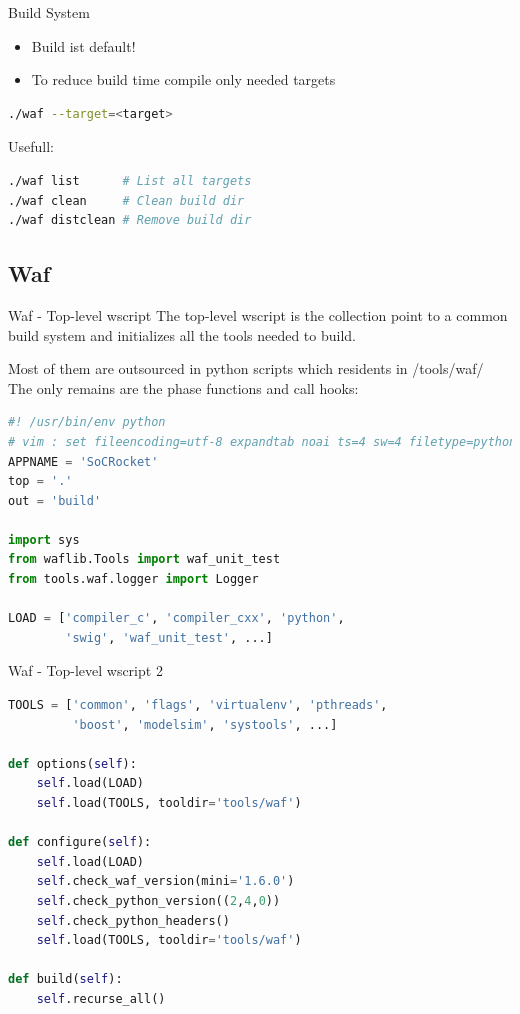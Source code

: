 \documentclass[fleqn,11pt,aspectratio=43]{beamer}
\begin{document}
\begin{frame}[fragile]{Build System}
  \begin{itemize}
    \item Build ist default!
    \item To reduce build time compile only needed targets
  \end{itemize}
  \begin{lstlisting}[language=bash]
./waf --target=<target>
  \end{lstlisting}

Usefull:
  \begin{lstlisting}[language=bash]
./waf list      # List all targets
./waf clean     # Clean build dir
./waf distclean # Remove build dir
  \end{lstlisting}
\end{frame}

\subsection{Waf}

\begin{frame}[fragile]{Waf - Top-level wscript}
The top-level wscript is the collection point to a common build system and initializes all the tools needed to build.

Most of them are outsourced in python scripts which residents in /tools/waf/
The only remains are the phase functions and call hooks:

\begin{lstlisting}[language=python]
#! /usr/bin/env python
# vim : set fileencoding=utf-8 expandtab noai ts=4 sw=4 filetype=python :
APPNAME = 'SoCRocket'
top = '.'
out = 'build'

import sys
from waflib.Tools import waf_unit_test
from tools.waf.logger import Logger

LOAD = ['compiler_c', 'compiler_cxx', 'python', 
        'swig', 'waf_unit_test', ...]
\end{lstlisting}
\end{frame}

\begin{frame}[fragile]{Waf - Top-level wscript 2}
\begin{lstlisting}[language=python]
TOOLS = ['common', 'flags', 'virtualenv', 'pthreads', 
         'boost', 'modelsim', 'systools', ...]

def options(self):
    self.load(LOAD)
    self.load(TOOLS, tooldir='tools/waf')

def configure(self):
    self.load(LOAD)
    self.check_waf_version(mini='1.6.0')
    self.check_python_version((2,4,0))
    self.check_python_headers()
    self.load(TOOLS, tooldir='tools/waf')

def build(self):
    self.recurse_all()
\end{lstlisting}
\end{frame}
\end{document}
